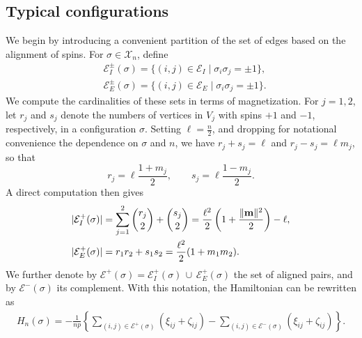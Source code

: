 \documentclass[11pt,oneside]{amsart}
\numberwithin{equation}{section}  %
\theoremstyle{plain}
\theoremstyle{remark}
\def \cE {\mathcal{E}}
\def \s {{\sigma}}
\def \bm {{\bf m}}
\begin{document}
\subsection{Typical configurations}\label{subsec:typical}
We begin by introducing a convenient partition of the set of edges based on the alignment of spins. For $\sigma \in \mathcal{X}_n$, define
\begin{equation*}
\begin{split}
&\cE_{I}^{\pm}(\sigma)=\{(i,j) \in \cE_I \mid \sigma_{i} \sigma_{j}=\pm 1\}, \\
&\cE_{E}^{\pm}(\sigma)=\{(i,j) \in \cE_E \mid \sigma_{i} \sigma_{j}=\pm 1\}.
\end{split}
\end{equation*}
We compute the cardinalities of these sets in terms of magnetization. For $j=1,2$, let $r_j$ and $s_j$ denote the numbers of vertices in $V_j$ with spins $+1$ and $-1$, respectively, in a configuration $\sigma$. Setting $\ell=\frac{n}{2}$, and dropping for notational convenience
the dependence  on $\s$ and $n$, we have $r_j+s_j=\ell$ and $r_j-s_j=\ell m_j$, so that
\[
r_j=\ell\frac{1+m_j}{2}, \qquad s_j=\ell\frac{1-m_j}{2}.
\]
A direct computation then gives
\begin{equation} \label{cardinality_partial}
\begin{aligned}
    &|\cE_{I}^{+}(\sigma)|=\sum_{j=1}^2 \binom{r_{j}}{2}+\binom{s_j}{2}=\frac{\ell^2}{2} \left ( 1+\frac{\|\bm\|^2}{2} \right )-\ell, \\ 
    &|\cE_{E}^{+}(\sigma)|=r_1r_2+s_1s_2=\frac{\ell^2}{2}(1+m_1m_2).
\end{aligned}
\end{equation}
We further denote by $\cE^{+}(\sigma)=\cE_{I}^{+}(\sigma)\, \cup \, \cE_{E}^{+}(\sigma)$ the set of aligned pairs, and by $\cE^{-}(\sigma)$ its complement. With this notation, the Hamiltonian can be rewritten as
\begin{align}\label{hamiltonian_ER_magnet}
H_n(\sigma)= -\frac{1}{np} \left\{\sum_{(i, j)\in \cE^{+}(\sigma)} (\xi_{i j}+\zeta_{i j})  - \sum_{(i, j)\in \cE^{-}(\sigma)} (\xi_{i j}+\zeta_{i j}) \right \}.
\end{align}
\end{document}
